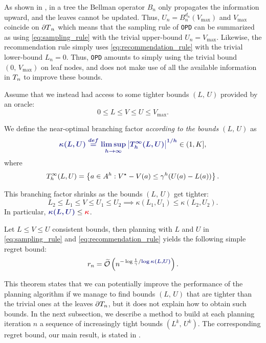 \documentclass[runningheads]{llncs}
\begin{document}
As shown in , in a tree the Bellman operator $B_n$ only propagates the information upward, and the leaves cannot be updated. Thus, $U_n = B_n^{d_n}(V_{\max})$ and $V_{\max}$ coincide on ${\partial T}_n$ which means that the sampling rule of \texttt{OPD} can be summarized as using \eqref{eq:sampling_rule} with the trivial upper-bound $U_n = V_{\max}$.
Likewise, the recommendation rule simply uses \eqref{eq:recommendation_rule} with the trivial lower-bound $L_n = 0$. Thus, \texttt{OPD} amounts to simply using the trivial bound $(0,\, V_{\max})$ on leaf nodes, and does not make use of all the available information in $T_n$ to improve these bounds.

Assume that we instead had access to some tighter bounds $(L,\,U)$ provided by an oracle: $$0\leq L\leq V\leq U\leq V_{\max}.$$
\begin{definition}
We define the near-optimal branching factor \emph{according to the bounds $(L,\,U)$} as 
\begin{equation}
\hlbb{\kappa(L,U) \eqdef \limsup_{h\rightarrow\infty} \left|\Tau_h^\infty(L,U)\right|^{1/h}}\in(1, K], 
\end{equation}
where
\begin{equation*}
     {T_h^\infty(L,U)}=\left\{a\in A^h: V^\star - V(a)\leq \gamma^{h}(U(a)-L(a))\right\}.
\end{equation*}
\end{definition}

\begin{lemma}This branching factor shrinks as the bounds $(L,\,U)$ get tighter:
\[L_2\leq L_1\leq V\leq U_1\leq U_2\implies \kappa(L_1,U_1) \leq \kappa(L_2,U_2).\]
In particular, $\hlbb{\kappa(L,U)} \leq \hlrb{\kappa}$.
\end{lemma}

\begin{theorem}
\label{thm:regret-bound-U}
Let $L \leq V\leq U$ consistent bounds, then planning with $L$ and $U$ in \eqref{eq:sampling_rule} and \eqref{eq:recommendation_rule} yields the following simple regret bound:
\begin{equation*}
r_n = \tilde{\cO}\left(n^{-\log \frac{1}{\gamma}/\hlbb{\log \kappa(L,U)}}\right).
\end{equation*}
\end{theorem}


This theorem states that we can potentially improve the performance of the planning algorithm if we manage to find bounds $(L,\, U)$ that are tighter than the trivial ones at the leaves ${\partial T_n}$, but it does not explain how to obtain such bounds. In the next subsection, we describe a method to build at each planning iteration $n$ a sequence of increasingly tight bounds $(L^k,\, U^k)$. The corresponding regret bound, our main result, is stated in .
\end{document}
